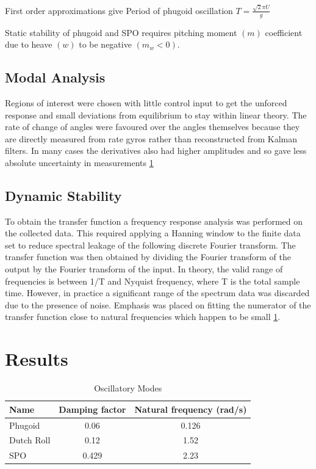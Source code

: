 \documentclass{article}
\begin{document}
First order approximations give
Period of phugoid oscillation $T = \frac{\sqrt{2} \pi U}{g}$

Static stability of phugoid and SPO requires pitching moment $(m)$ coefficient due to heave $(w)$ to be negative $(m_w < 0)$.

\subsection{Modal Analysis}

Regions of interest were chosen with little control input to get the unforced response and small deviations
from equilibrium to stay within linear theory. The rate of change of angles were favoured over the angles
themselves because they are directly measured from rate gyros rather than reconstructed from Kalman
filters. In many cases the derivatives also had higher amplitudes and so gave less absolute uncertainty in
measurements \ref{tab:oscillatory_modes}


\subsection{Dynamic Stability}


To obtain the transfer function a frequency response analysis was performed on the collected data.
This required applying a Hanning window to the finite data set to reduce spectral leakage of the following discrete Fourier transform.
The transfer function was then obtained by dividing the Fourier transform of the output by the Fourier transform of the input.
In theory, the valid range of frequencies is between 1/T and Nyquist frequency, where T is the total sample time.
However, in practice a significant range of the spectrum data was discarded due to the presence of noise.
Emphasis was placed on fitting the numerator of the transfer function close to natural frequencies which happen to be small \ref{tab:oscillatory_modes}.

\section{Results}


\begin{table}[H]
  \centering
  \begin{tabular}{lcc}
      \toprule
      Name & Damping factor & Natural frequency (rad/s) \\
      \midrule
      Phugoid & 0.06 & 0.126 \\
      Dutch Roll & 0.12 & 1.52 \\
      SPO & 0.429 & 2.23 \\
      \bottomrule
  \end{tabular}
  \caption{Oscillatory Modes}
    \label{tab:oscillatory_modes}
\end{table}
\end{document}
